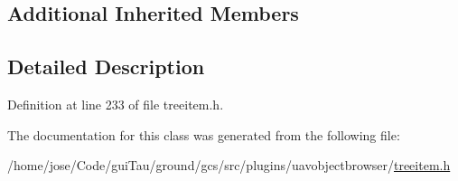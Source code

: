 \subsection*{Additional Inherited Members}


\subsection{Detailed Description}


Definition at line 233 of file treeitem.\-h.



The documentation for this class was generated from the following file\-:\begin{DoxyCompactItemize}
\item 
/home/jose/\-Code/gui\-Tau/ground/gcs/src/plugins/uavobjectbrowser/\hyperlink{treeitem_8h}{treeitem.\-h}\end{DoxyCompactItemize}
